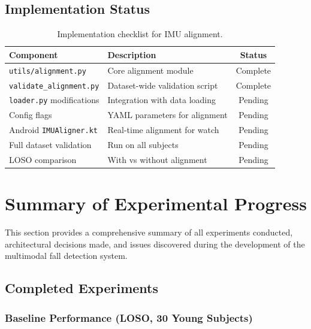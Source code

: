 \subsection{Implementation Status}

\begin{table}[h]
    \centering
    \caption{Implementation checklist for IMU alignment.}
    \label{tab:implementation_status}
    \begin{tabular}{llc}
        \toprule
        Component & Description & Status \\
        \midrule
        \texttt{utils/alignment.py} & Core alignment module & Complete \\
        \texttt{validate\_alignment.py} & Dataset-wide validation script & Complete \\
        \texttt{loader.py} modifications & Integration with data loading & Pending \\
        Config flags & YAML parameters for alignment & Pending \\
        Android \texttt{IMUAligner.kt} & Real-time alignment for watch & Pending \\
        Full dataset validation & Run on all subjects & Pending \\
        LOSO comparison & With vs without alignment & Pending \\
        \bottomrule
    \end{tabular}
\end{table}


\section{Summary of Experimental Progress}

This section provides a comprehensive summary of all experiments conducted, architectural decisions made, and issues discovered during the development of the multimodal fall detection system.

\subsection{Completed Experiments}

\subsubsection{Baseline Performance (LOSO, 30 Young Subjects)}

